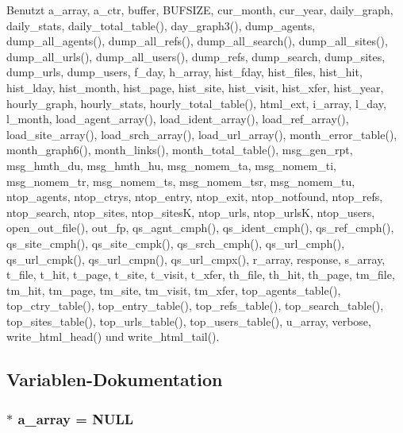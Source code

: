 Benutzt a\_\-array, a\_\-ctr, buffer, BUFSIZE, cur\_\-month, cur\_\-year, daily\_\-graph, daily\_\-stats, daily\_\-total\_\-table(), day\_\-graph3(), dump\_\-agents, dump\_\-all\_\-agents(), dump\_\-all\_\-refs(), dump\_\-all\_\-search(), dump\_\-all\_\-sites(), dump\_\-all\_\-urls(), dump\_\-all\_\-users(), dump\_\-refs, dump\_\-search, dump\_\-sites, dump\_\-urls, dump\_\-users, f\_\-day, h\_\-array, hist\_\-fday, hist\_\-files, hist\_\-hit, hist\_\-lday, hist\_\-month, hist\_\-page, hist\_\-site, hist\_\-visit, hist\_\-xfer, hist\_\-year, hourly\_\-graph, hourly\_\-stats, hourly\_\-total\_\-table(), html\_\-ext, i\_\-array, l\_\-day, l\_\-month, load\_\-agent\_\-array(), load\_\-ident\_\-array(), load\_\-ref\_\-array(), load\_\-site\_\-array(), load\_\-srch\_\-array(), load\_\-url\_\-array(), month\_\-error\_\-table(), month\_\-graph6(), month\_\-links(), month\_\-total\_\-table(), msg\_\-gen\_\-rpt, msg\_\-hmth\_\-du, msg\_\-hmth\_\-hu, msg\_\-nomem\_\-ta, msg\_\-nomem\_\-ti, msg\_\-nomem\_\-tr, msg\_\-nomem\_\-ts, msg\_\-nomem\_\-tsr, msg\_\-nomem\_\-tu, ntop\_\-agents, ntop\_\-ctrys, ntop\_\-entry, ntop\_\-exit, ntop\_\-notfound, ntop\_\-refs, ntop\_\-search, ntop\_\-sites, ntop\_\-sites\-K, ntop\_\-urls, ntop\_\-urls\-K, ntop\_\-users, open\_\-out\_\-file(), out\_\-fp, qs\_\-agnt\_\-cmph(), qs\_\-ident\_\-cmph(), qs\_\-ref\_\-cmph(), qs\_\-site\_\-cmph(), qs\_\-site\_\-cmpk(), qs\_\-srch\_\-cmph(), qs\_\-url\_\-cmph(), qs\_\-url\_\-cmpk(), qs\_\-url\_\-cmpn(), qs\_\-url\_\-cmpx(), r\_\-array, response, s\_\-array, t\_\-file, t\_\-hit, t\_\-page, t\_\-site, t\_\-visit, t\_\-xfer, th\_\-file, th\_\-hit, th\_\-page, tm\_\-file, tm\_\-hit, tm\_\-page, tm\_\-site, tm\_\-visit, tm\_\-xfer, top\_\-agents\_\-table(), top\_\-ctry\_\-table(), top\_\-entry\_\-table(), top\_\-refs\_\-table(), top\_\-search\_\-table(), top\_\-sites\_\-table(), top\_\-urls\_\-table(), top\_\-users\_\-table(), u\_\-array, verbose, write\_\-html\_\-head() und write\_\-html\_\-tail().

\subsection{Variablen-Dokumentation}
\subsubsection{$\ast$ {\bf a\_\-array} = NULL}\label{output_8c_087fc5e1d70a57bb687006545cd89b68}




